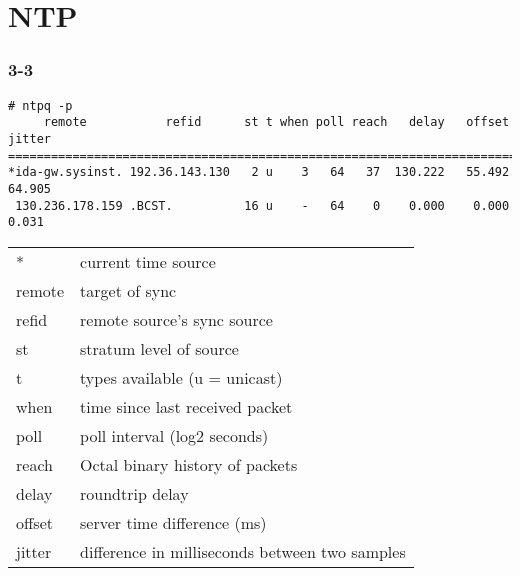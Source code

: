 
\chapter{NTP}
\subsection{3-3}
\begin{verbatim}
# ntpq -p
     remote           refid      st t when poll reach   delay   offset  jitter
==============================================================================
*ida-gw.sysinst. 192.36.143.130   2 u    3   64   37  130.222   55.492  64.905
 130.236.178.159 .BCST.          16 u    -   64    0    0.000    0.000   0.031
\end{verbatim}
\vspace{1cm}
\begin{tabular}{l|l}
  * & current time source \\
  remote & target of sync \\
  refid & remote source's sync source \\
  st & stratum level of source\\
  t & types available (u = unicast)\\
  when & time since last received packet\\
  poll & poll interval (log2 seconds)\\
  reach & Octal binary history of packets\\
  delay & roundtrip delay\\
  offset & server time difference (ms)\\
  jitter &difference in milliseconds between two samples
\end{tabular}


